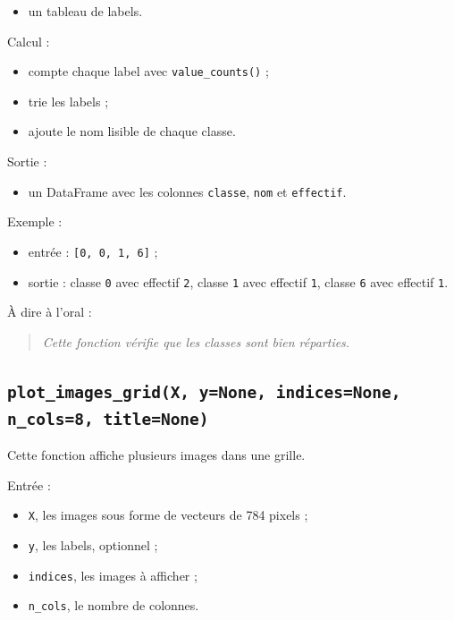 \documentclass[11pt,a4paper]{article}
\begin{document}
\begin{itemize}
\item un tableau de labels.
\end{itemize}

Calcul :

\begin{itemize}
\item compte chaque label avec \texttt{value\_counts()} ;
\item trie les labels ;
\item ajoute le nom lisible de chaque classe.
\end{itemize}

Sortie :

\begin{itemize}
\item un DataFrame avec les colonnes \texttt{classe}, \texttt{nom} et \texttt{effectif}.
\end{itemize}

Exemple :

\begin{itemize}
\item entrée : \texttt{[0, 0, 1, 6]} ;
\item sortie : classe \texttt{0} avec effectif \texttt{2}, classe \texttt{1} avec effectif \texttt{1}, classe \texttt{6} avec effectif \texttt{1}.
\end{itemize}

À dire à l'oral :

\begin{quote}
\itshape Cette fonction vérifie que les classes sont bien réparties.
\end{quote}

\subsection{\texttt{plot\_images\_grid(X, y=None, indices=None, n\_cols=8, title=None)}}

Cette fonction affiche plusieurs images dans une grille.

Entrée :

\begin{itemize}
\item \texttt{X}, les images sous forme de vecteurs de 784 pixels ;
\item \texttt{y}, les labels, optionnel ;
\item \texttt{indices}, les images à afficher ;
\item \texttt{n\_cols}, le nombre de colonnes.
\end{itemize}
\end{document}
